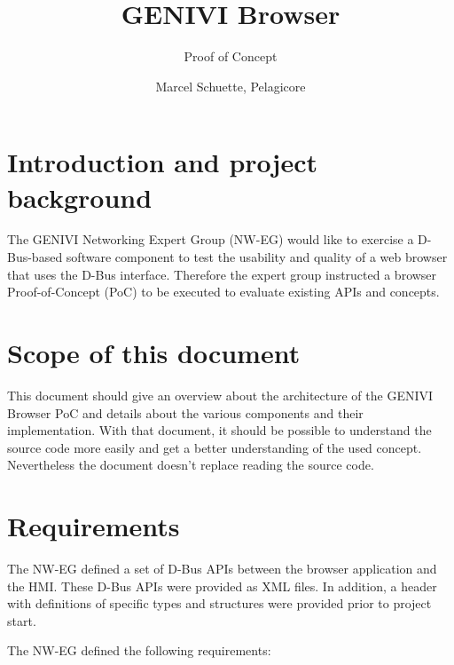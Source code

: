 \documentclass{pelagicore}
\begin{document}
\title {GENIVI Browser}
\subtitle {Proof of Concept}
\revisiondate{\today}
\author{Marcel Schuette, Pelagicore}
\filename{\jobname}
\bannerlogoheight{0.5in}
\usefrontmetadatatrue
{}

\maketitle
\tableofcontents \clearpage


\section{Introduction and project background}
The GENIVI Networking Expert Group (NW-EG) would like to exercise a D-Bus-based
software component to test the usability and quality of a web browser that uses
the D-Bus interface. Therefore the expert group instructed a browser
Proof-of-Concept (PoC) to be executed to evaluate existing APIs and concepts.

\section{Scope of this document}

This document should give an overview about the architecture of the GENIVI
Browser PoC and details about the various components and their implementation.
With that document, it should be possible to understand the source code more
easily and get a better understanding of the used concept. Nevertheless the
document doesn’t replace reading the source code.

\section{Requirements}

The NW-EG defined a set of D-Bus APIs between the browser application and the
HMI.  These D-Bus APIs were provided as XML files. In addition, a header with
definitions of specific types and structures were provided prior to project
start.

The NW-EG defined the following requirements:
\end{document}
